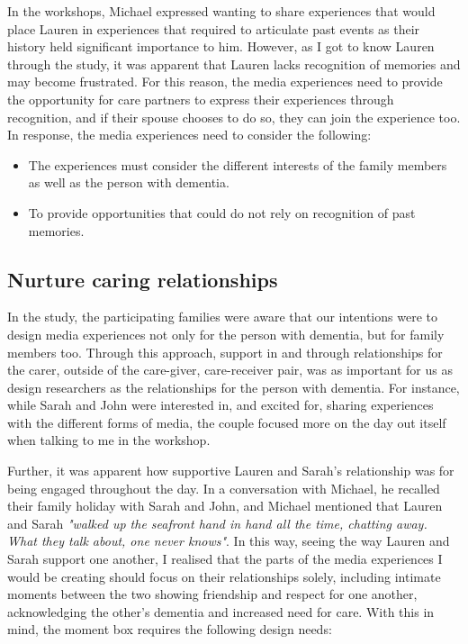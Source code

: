 In the workshops, Michael expressed wanting to share experiences that would place Lauren in experiences that required to articulate past events as their history held significant importance to him. However, as I got to know Lauren through the study, it was apparent that Lauren lacks recognition of memories and may become frustrated. For this reason, the media experiences need to provide the opportunity for care partners to express their experiences through recognition, and if their spouse chooses to do so, they can join the experience too. In response, the media experiences need to consider the following:
\begin{itemize}
    \item The experiences must consider the different interests of the family members as well as the person with dementia. 
    \item To provide opportunities that could do not rely on recognition of past memories.
\end{itemize}

\subsection{Nurture caring relationships}
\label{CaringRelationships}
In the study, the participating families were aware that our intentions were to design media experiences not only for the person with dementia, but for family members too. Through this approach, support in and through relationships for the carer, outside of the care-giver, care-receiver pair, was as important for us as design researchers as the relationships for the person with dementia. For instance, while Sarah and John were interested in, and excited for, sharing experiences with the different forms of media, the couple focused more on the day out itself when talking to me in the workshop. 

Further, it was apparent how supportive Lauren and Sarah's relationship was for being engaged throughout the day. In a conversation with Michael, he recalled their family holiday with Sarah and John, and Michael mentioned that Lauren and Sarah \textit{"walked up the seafront hand in hand all the time, chatting away. What they talk about, one never knows"}. In this way, seeing the way Lauren and Sarah support one another, I realised that the parts of the media experiences I would be creating should focus on their relationships solely, including intimate moments between the two showing friendship and respect for one another, acknowledging the other's dementia and increased need for care. With this in mind, the moment box requires the following design needs:

